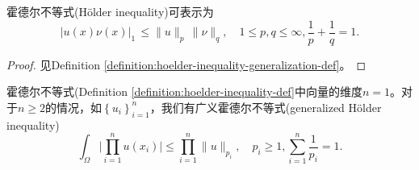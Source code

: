 \begin{definition}[霍德尔不等式]
  \label{definition:hoelder-inequality-def}
  霍德尔不等式(Hölder inequality)可表示为
  \begin{equation*}
    \left| u(x) \nu(x) \right|_{1} \, \le \|u\|_p \,  \|\nu\|_q, \quad 1 \le p, q \le \infty, \frac{1}{p} + \frac{1}{q} = 1.
  \end{equation*}
\end{definition}
\begin{proof}
  见Definition \ref{definition:hoelder-inequality-generalization-def}。
\end{proof}
\begin{definition}[广义霍德尔不等式]
  \label{definition:hoelder-inequality-generalization-def}
  霍德尔不等式(Definition \ref{definition:hoelder-inequality-def}中向量的维度$n=1$。对于$n \ge 2$的情况，如$\left\{ u_i \right\}_{i=1}^{n}$，我们有广义霍德尔不等式(generalized Hölder inequality)
  \begin{equation}
    \label{eq:hoelder-inequality-generalization-def}
    \int_{\Omega} \big| \prod_{i=1}^{n} u(x_i)\big| \le \prod_{i=1}^{n} \big\| u \big\|_{p_i}, \quad p_i \ge 1, \sum_{i=1}^{n} \frac{1}{p_i}=1.
  \end{equation}
\end{definition}
